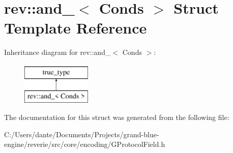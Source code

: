 \hypertarget{structrev_1_1and__}{}\section{rev\+::and\+\_\+$<$ Conds $>$ Struct Template Reference}
\label{structrev_1_1and__}
Inheritance diagram for rev\+::and\+\_\+$<$ Conds $>$\+:\begin{figure}[H]
\begin{center}
\leavevmode
\includegraphics[height=2.000000cm]{structrev_1_1and__}
\end{center}
\end{figure}


The documentation for this struct was generated from the following file\+:\begin{DoxyCompactItemize}
\item 
C\+:/\+Users/dante/\+Documents/\+Projects/grand-\/blue-\/engine/reverie/src/core/encoding/G\+Protocol\+Field.\+h\end{DoxyCompactItemize}
